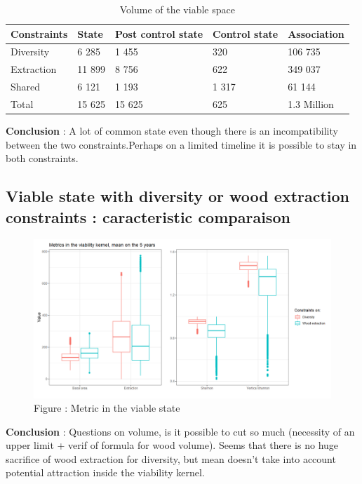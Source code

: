 \documentclass{article}
\begin{document}
\begin{table}[H]
    \centering
    \begin{tabular}{l l l l l}
    \hline
    \hline
    \textbf{Constraints} & \textbf{State} & \textbf{Post control state} & \textbf{Control state} & \textbf{Association} \\
    \hline
    Diversity  & 6 285 & 1 455 & 320 & 106 735 \\
    Extraction & 11 899 & 8 756 & 622 & 349 037 \\
    Shared & 6 121 & 1 193 & 1 317 & 61 144 \\  
    Total     & 15 625 & 15 625 & 625 & 1.3 Million \\
    \hline
    \hline
    \end{tabular}
    \caption{Volume of the viable space}
    \label{tab:Viab_volume}
\end{table}

\textbf{Conclusion} : A lot of common state even though there is an incompatibility between the two constraints.Perhaps on a limited timeline it is possible to stay in both constraints.\\

\subsection{Viable state with diversity or wood extraction constraints : caracteristic comparaison}

\begin{figure}[h]
    \centering
    \includegraphics[width=\textwidth]{Figure/Viab_metric_mean.png}
    \caption{Figure : Metric in the viable state}
    \label{fig:Viab_metric_comp}
\end{figure}

\textbf{Conclusion} : Questions on volume, is it possible to cut so much (necessity of an upper limit + verif of formula for wood volume). Seems that there is no huge sacrifice of wood extraction for diversity, but mean doesn't take into account potential attraction inside the viability kernel.\\
\end{document}
